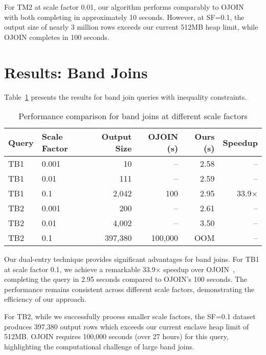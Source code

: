 For TM2 at scale factor 0.01, our algorithm performs comparably to OJOIN~\cite{hu2025optimal} with both completing in approximately 10 seconds. However, at SF=0.1, the output size of nearly 3 million rows exceeds our current 512MB heap limit, while OJOIN completes in 100 seconds.


\section{Results: Band Joins}

Table~\ref{tab:band-joins} presents the results for band join queries with inequality constraints.

\begin{table}[h]
\centering
\caption{Performance comparison for band joins at different scale factors}
\label{tab:band-joins}
\begin{tabular}{llrrrr}
\toprule
Query & Scale Factor & Output Size & OJOIN (s) & Ours (s) & Speedup \\
\midrule
TB1 & 0.001 & 10 & -- & 2.58 & -- \\
TB1 & 0.01 & 111 & -- & 2.59 & -- \\
TB1 & 0.1 & 2,042 & 100 & 2.95 & 33.9× \\
\midrule
TB2 & 0.001 & 200 & -- & 2.61 & -- \\
TB2 & 0.01 & 4,002 & -- & 3.50 & -- \\
TB2 & 0.1 & 397,380 & 100,000 & OOM\footnotemark & -- \\
\bottomrule
\end{tabular}
\end{table}

Our dual-entry technique provides significant advantages for band joins. For TB1 at scale factor 0.1, we achieve a remarkable 33.9× speedup over OJOIN~\cite{hu2025optimal}, completing the query in 2.95 seconds compared to OJOIN's 100 seconds. The performance remains consistent across different scale factors, demonstrating the efficiency of our approach.

For TB2, while we successfully process smaller scale factors, the SF=0.1 dataset produces 397,380 output rows which exceeds our current enclave heap limit of 512MB. OJOIN requires 100,000 seconds (over 27 hours) for this query, highlighting the computational challenge of large band joins.



